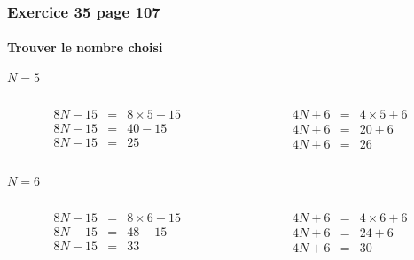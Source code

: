 \documentclass[xcolor={dvipsnames}]{beamer}
\begin{document}
\begin{frame}
	\frametitle{Exercice 35 page 107}
	\framesubtitle{Trouver le nombre choisi}
	
	
	\begin{block}{$N = 5$}
		
		\begin{columns}
			\begin{column}{0.5\textwidth}
				\begin{eqnarray*}
					8N - 15 &=&  8 \times 5 - 15 \\ 
					8N - 15 &=& 40 - 15 \\ 
					8N - 15 &=& 25 
				\end{eqnarray*}
			\end{column}
			
			
			\begin{column}{0.5\textwidth}
				\begin{eqnarray*}
					4N + 6 &=&  4 \times 5 + 6 \\ 
					4N + 6 &=& 20 + 6 \\ 
					4N + 6 &=& 26 
				\end{eqnarray*}
			\end{column}
		\end{columns}
		
	\end{block}
	
	\begin{block}{$N = 6$}
		
		\begin{columns}
			\begin{column}{0.5\textwidth}
				\begin{eqnarray*}
					8N - 15 &=&  8 \times 6 - 15 \\ 
					8N - 15 &=& 48 - 15 \\ 
					8N - 15 &=& 33 
				\end{eqnarray*}
			\end{column}
			
			
			\begin{column}{0.5\textwidth}
				\begin{eqnarray*}
					4N + 6 &=&  4 \times 6 + 6 \\ 
					4N + 6 &=& 24 + 6 \\ 
					4N + 6 &=& 30 
				\end{eqnarray*}
			\end{column}
		\end{columns}
		
	\end{block}
	
\end{frame}
\end{document}
